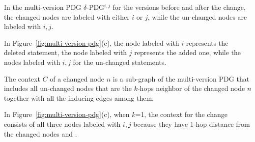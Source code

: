 \begin{Definition}
In the multi-version PDG $\delta$-PDG$^{i,j}$ for the versions before and after the
change, the changed nodes are labeled with either $i$ or $j$, while
the un-changed nodes are labeled with $i,j$.
\end{Definition}

In Figure~\ref{fig:multi-version-pdg}(c), the node labeled with $i$
represents the deleted statement, the node labeled with $j$ represents
the added one, while the nodes labeled with $i,j$ for the un-changed
statements.


\begin{Definition}[Context]
The context $C$ of a changed node $n$ is a sub-graph of the
multi-version PDG that includes all un-changed nodes that are the
$k$-hops neighbor of the changed node $n$ together with all the
inducing edges among them.
\end{Definition}

In Figure~\ref{fig:multi-version-pdg}(c), when $k$=1, the context for
the change consists of all three nodes labeled with $i,j$ because they have
1-hop distance from the changed nodes  and
.





